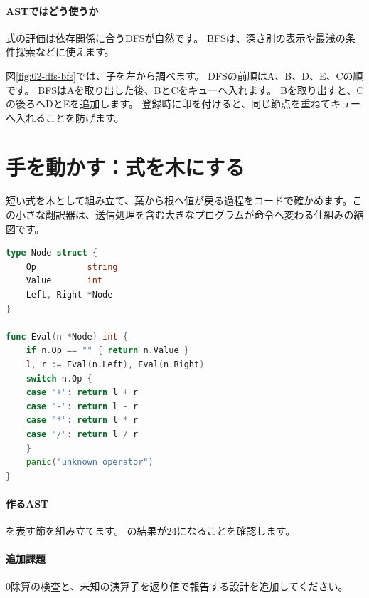 \paragraph{ASTではどう使うか}
        式の評価は依存関係に合うDFSが自然です。
        BFSは、深さ別の表示や最浅の条件探索などに使えます。

\par
\endgroup
\par
\endgroup


図\ref{fig:02-dfs-bfs}では、子を左から調べます。
DFSの前順はA、B、D、E、Cの順です。
BFSはAを取り出した後、BとCをキューへ入れます。
Bを取り出すと、Cの後ろへDとEを追加します。
登録時に印を付けると、同じ節点を重ねてキューへ入れることを防げます。


\FloatBarrier
\section{手を動かす：式を木にする}
\label{sec:02-language-14}

短い式を木として組み立て、葉から根へ値が戻る過程をコードで確かめます。この小さな翻訳器は、送信処理を含む大きなプログラムが命令へ変わる仕組みの縮図です。

\begingroup
\begingroup
      \begin{lstlisting}[language=Go]
type Node struct {
    Op          string
    Value       int
    Left, Right *Node
}

func Eval(n *Node) int {
    if n.Op == "" { return n.Value }
    l, r := Eval(n.Left), Eval(n.Right)
    switch n.Op {
    case "+": return l + r
    case "-": return l - r
    case "*": return l * r
    case "/": return l / r
    }
    panic("unknown operator")
}
      \end{lstlisting}
\par
\endgroup
\medskip
\begingroup
\paragraph{作るAST}
         を表す節を組み立てます。
        の結果が24になることを確認します。

\paragraph{追加課題}
        0除算の検査と、未知の演算子を返り値で報告する設計を追加してください。


